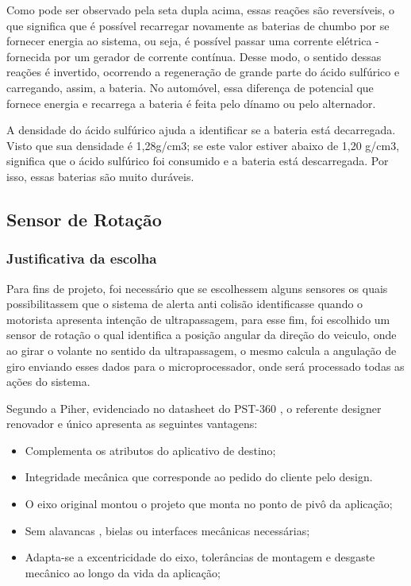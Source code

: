 Como pode ser observado pela seta dupla acima, essas reações são reversíveis, o
que significa que é possível recarregar novamente as baterias de chumbo por se
fornecer energia ao sistema, ou seja, é possível passar uma corrente elétrica
-fornecida por um gerador de corrente contínua. Desse modo, o sentido dessas
reações é invertido, ocorrendo a regeneração de grande parte do ácido sulfúrico
e carregando, assim, a bateria. No automóvel, essa diferença de potencial que
fornece energia e recarrega a bateria é feita pelo dínamo ou pelo alternador.

A densidade do ácido sulfúrico ajuda a identificar se a bateria está decarregada.
Visto que sua densidade é 1,28g/cm3; se este valor estiver abaixo de 1,20 g/cm3,
significa que o ácido sulfúrico foi consumido e a bateria está descarregada.
Por isso, essas baterias são muito duráveis.

\subsection{Sensor de Rotação}

\subsubsection{Justificativa da escolha}
Para fins de projeto, foi necessário que se escolhessem alguns sensores os quais
possibilitassem que o sistema de alerta anti colisão identificasse quando o motorista
apresenta intenção de ultrapassagem, para esse fim, foi escolhido um sensor de rotação o
 qual identifica a posição angular da direção do veiculo, onde ao girar o volante no
 sentido da ultrapassagem, o mesmo calcula a angulação de giro enviando esses
 dados para o microprocessador, onde será processado todas as ações do sistema.

Segundo a Piher, evidenciado no datasheet do PST-360 \cite{sensor_rotacao}, o referente designer
renovador e único apresenta as seguintes vantagens:

\begin{itemize}
  \item Complementa os atributos do aplicativo de destino;
  \item Integridade mecânica que corresponde ao pedido do cliente pelo design.
  \item O eixo original montou o projeto que monta no ponto de pivô da aplicação;

  \item Sem alavancas , bielas ou interfaces mecânicas necessárias;

  \item Adapta-se a excentricidade do eixo, tolerâncias de montagem e
  desgaste mecânico ao longo da vida da aplicação;

\end{itemize}

